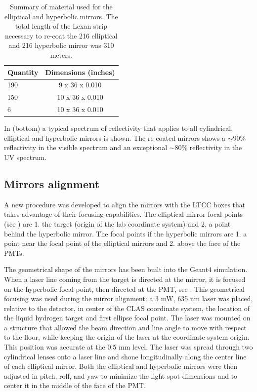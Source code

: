 \begin{table}
	\begin{center}
		\begin{tabular}{| l | c |}
			\hline \hline
			Quantity  & Dimensions (inches) \\
			\hline
			190       & 9  x 36 x 0.010  \\
			150       & 10 x 36 x 0.010  \\
			6         & 10 x 36 x 0.010  \\
			\hline \hline
		\end{tabular}
	\end{center}
	\caption{Summary of material used for the elliptical and hyperbolic mirrors. The total length of the Lexan strip necessary to re-coat the 216 elliptical
            and 216 hyperbolic mirror was 310 meters.}\label{tab:strips}
\end{table}


In  (bottom) a typical spectrum of reflectivity that applies to all cylindrical, elliptical and hyperbolic mirrors is shown.
The re-coated mirrors shows a $\sim 90\%$ reflectivity in the visible spectrum and an exceptional $\sim 80\%$
reflectivity in the UV spectrum.



\subsection{Mirrors alignment}

A new procedure was developed to align the mirrors with the LTCC boxes that takes advantage of their focusing capabilities.
The elliptical mirror focal points (see ) are 1. the target (origin of the lab coordinate system)
and 2. a point behind the hyperbolic mirror. The focal points if the hyperbolic mirrors are 1. a point near the focal point of the elliptical mirrors and
2. above the face of the PMTs.

The geometrical shape of the mirrors has been built into the Geant4 simulation. When a laser line coming from the target is directed at the mirror,
it is focused on the hyperbolic focal point, then directed at the PMT, see .
This geometrical focusing was used during the mirror alignment: a 3 mW, 635 nm laser was placed, relative to the detector,
in center of the CLAS coordinate system, the location of the liquid hydrogen target and first ellipse focal point.
The laser was mounted on a structure that allowed the beam direction and line angle to move with respect to the floor, while keeping
the origin of the laser at the coordinate system origin.
This position was accurate at the 0.5 mm level. The laser was spread through two cylindrical lenses onto a laser line and shone
longitudinally along the center line of each elliptical mirror. Both the elliptical and hyperbolic mirrors were then adjusted in pitch, roll, and yaw to minimize the light spot
dimensions and to center it in the middle of the face of the PMT.


